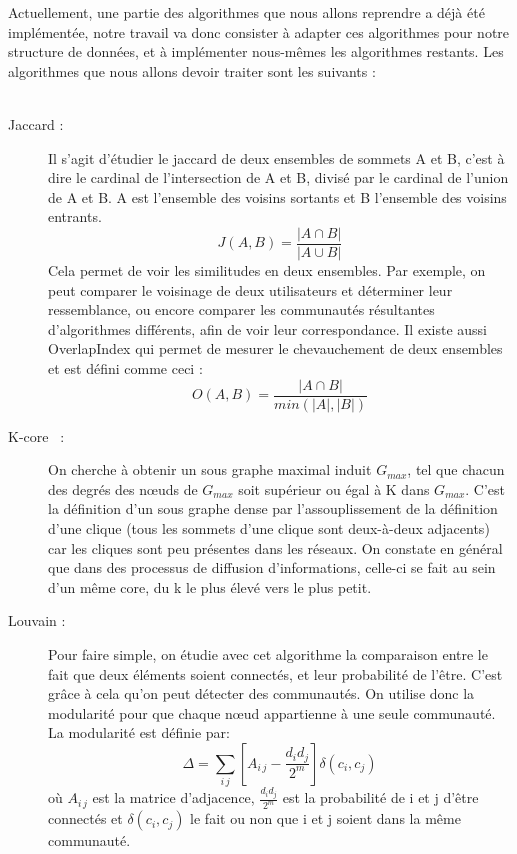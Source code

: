 \begin{titlepage}
\vspace{1cm}
{
Actuellement, une partie des algorithmes que nous allons reprendre a déjà été implémentée, notre travail va donc consister à adapter ces algorithmes pour notre structure de données, et à implémenter nous-mêmes les algorithmes restants. 
Les algorithmes que nous allons devoir traiter sont les suivants : \\ \\
	
\begin{description}
\item[Jaccard :] Il s'agit d'étudier le jaccard \cite{jaccard} de deux ensembles de sommets A et B, c'est à dire le cardinal de l'intersection de A et B, divisé par le cardinal de l'union de A et B. A est l'ensemble des voisins sortants et B l'ensemble des voisins entrants. \[J(A,B) = \frac{|A \cap B|}{|A \cup B|}\] Cela permet de voir les similitudes en deux ensembles. Par exemple, on peut comparer le voisinage de deux utilisateurs et déterminer leur ressemblance, ou encore comparer les communautés résultantes d'algorithmes différents, afin de voir leur correspondance. Il existe aussi OverlapIndex qui permet de mesurer le chevauchement de deux ensembles et est défini comme ceci : \[O(A,B) = \frac{|A \cap B|}{min(|A|,|B|)}\]
\item[K-core~\cite{alvarezhamelin} :] On cherche à obtenir un sous graphe maximal induit $G_{max}$, tel que chacun des degrés des nœuds de $G_{max}$ soit supérieur ou égal à K dans $G_{max}$. C'est la définition d'un sous graphe dense par l'assouplissement de la définition d'une clique (tous les sommets d'une clique sont deux-à-deux adjacents) car les cliques sont peu présentes dans les réseaux. On constate en général que dans des processus de diffusion d'informations, celle-ci se fait au sein d'un même core, du k le plus élevé vers le plus petit.
\newline
\item[Louvain :] Pour faire simple, on étudie avec cet algorithme la comparaison entre le fait que deux éléments  soient connectés, et leur probabilité de l'être. C'est grâce à cela qu'on peut détecter des communautés. On utilise donc la modularité pour que chaque nœud appartienne à une seule communauté. La modularité est définie par: \[\Delta=\sum_{i\,j}\left[ A_{i\,j}-\frac{d_i d_j}{2^m}\right] \delta\left(c_i , c_j \right)\] où $A_{i\,j}$ est la matrice d'adjacence, $\frac{d_i d_j}{2^m}$ est la probabilité de i et j d'être connectés et $\delta(c_i , c_j)$ le fait ou non que i et j soient dans la même communauté.


\end{description}}
\end{titlepage}
